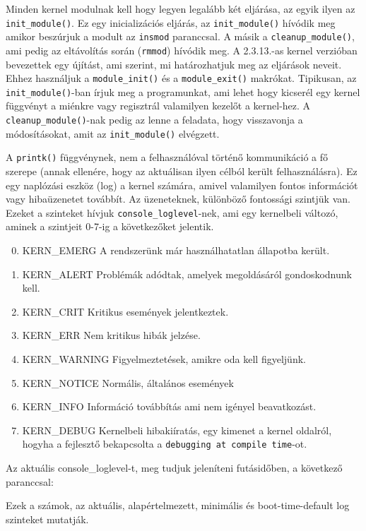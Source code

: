 Minden kernel modulnak kell hogy legyen legalább két eljárása, az egyik ilyen az \texttt{init\_module()}.
Ez egy inicializációs eljárás, az \texttt{init\_module()} hívódik meg amikor beszúrjuk a modult az \texttt{insmod} paranccsal.
A másik a \texttt{cleanup\_module()}, ami pedig az eltávolítás során (\texttt{rmmod}) hívódik meg.
A 2.3.13.-as kernel verzióban bevezettek egy újítást, ami szerint, mi határozhatjuk meg az eljárások neveit. Ehhez használjuk a \texttt{module\_init()} és a \texttt{module\_exit()} makrókat. Tipikusan, az \texttt{init\_module()}-ban írjuk meg a programunkat, ami lehet hogy kicserél egy kernel függvényt a miénkre vagy regisztrál valamilyen kezelőt a kernel-hez. A \texttt{cleanup\_module()}-nak pedig az lenne a feladata, hogy visszavonja a módosításokat, amit az \texttt{init\_module()} elvégzett.

A \texttt{printk()} függvénynek, nem a felhasználóval történő kommunikáció a fő szerepe (annak ellenére, hogy az aktuálisan ilyen célból került felhasználásra). Ez egy naplózási eszköz (log) a kernel számára, amivel valamilyen fontos információt vagy hibaüzenetet továbbít. Az üzeneteknek, különböző fontossági szintjük van. Ezeket a szinteket hívjuk \texttt{console\_loglevel}-nek, ami egy kernelbeli változó, aminek a szintjeit 0-7-ig a következőket jelentik. 

\begin{enumerate}
\setcounter{enumi}{-1}
	\item KERN\_EMERG \- A rendszerünk már használhatatlan állapotba került.
	\item KERN\_ALERT \- Problémák adódtak, amelyek megoldásáról gondoskodnunk kell.
	\item KERN\_CRIT \- Kritikus események jelentkeztek.
	\item KERN\_ERR \- Nem kritikus hibák jelzése.
	\item KERN\_WARNING	\- Figyelmeztetések, amikre oda kell figyeljünk.
	\item KERN\_NOTICE \- Normális, általános események
	\item KERN\_INFO \- Információ továbbítás ami nem igényel beavatkozást.
	\item KERN\_DEBUG \- Kernelbeli hibakiíratás, egy kimenet a kernel oldalról, hogyha a fejlesztő bekapcsolta a \texttt{debugging at compile time}-ot.
\end{enumerate}
Az aktuális console\_loglevel-t, meg tudjuk jeleníteni futásidőben, a következő paranccsal:
Ezek a számok, az aktuális, alapértelmezett, minimális és boot-time-default log szinteket mutatják.

